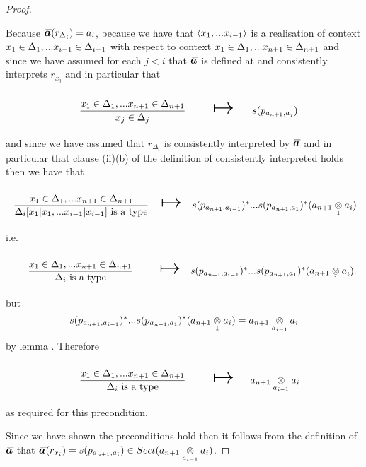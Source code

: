 \begin{proof}
\begin{enumerate}
Because $\Ibar(r_{\Delta_i}) = a_i$,
because  we have that
$\langle x_1,...x_{i-1}\rangle$ is a realisation of context $x_1 \in \Delta_1,... x_{i-1} \in \Delta_{i-1}$ with respect to context $x_1 \in \Delta_1,... x_{n+1} \in \Delta_{n+1}$ 
and since we have assumed for each $j<i$ that $\Ibar$ is defined at and consistently interprets $r_{x_j}$  and in particular
that
\begin{equation*}
\begin{array}{c c c }
\forceSOURCEwidth & & \forceTARGETwidth \\ [-0.1cm]
\gatdisplayrule{\xDelta{n+1}}{\ofT{x_j}{\Delta_j}}  & \Imapsto & s(p_{a_{n+1},a_j}) \\ [0.4cm]
\end{array}
\end{equation*}
and since we have assumed that $r_{\Delta_i}$ is consistently interpreted by $\Ibar$ and in particular that clause (ii)(b) of the definition of consistently interpreted holds
then we have that
\begin{equation*}
\begin{array}{c c c}
\forceSOURCEwidth & & \forceTARGETwidth \\ [-0.1cm]
\gatdisplayrule{\xDelta{n+1}}{\isT{\Delta_i[x_1|x_1,...x_{i-1}|x_{i-1}]}}  & \Imapsto & \deltaimappedlong \\ [0.4cm]
\end{array}
\end{equation*}
i.e.
\begin{equation*}
\begin{array}{c c c}
\forceSOURCEwidth & & \forceTARGETwidth \\ [-0.1cm]
\DDelta{n+1}{i}  & \Imapsto & \deltaimappedlong.\\ [0.4cm]
\end{array}
\end{equation*}
but
\begin{equation*}
s(p_{a_{n+1},a_{i-1}})^*...s(p_{a_{n+1},a_1})^*(a_{n+1} \underset{1}{\otimes} a_i) = a_{n+1} \underset{a_{i-1}}{\otimes} a_i
\end{equation*}  
 by lemma .
 Therefore \begin{equation*}
\begin{array}{c c c}
\forceSOURCEwidth & & \forceTARGETwidth \\ [-0.1cm]
\DDelta{n+1}{i}  & \Imapsto & \deltaimapped\\ [0.4cm]
\end{array}
\end{equation*}
as required for this precondition.
\end{enumerate}
Since we have shown the preconditions hold then it follows from the definition of $\Ibar$ that 
 $\Ibar(r_{x_i})=s(p_{a_{n+1},a_i}) \in Sect(\crossx{a_{n+1}}{a_i}{a_{i-1}})$.


\end{proof}

